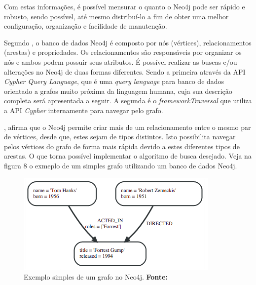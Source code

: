 
\par Com estas informações, é possível mensurar o quanto o Neo4j pode ser rápido e robusto, sendo possível, até mesmo distribuí-lo a fim de obter uma melhor configuração, organização e facilidade de manutenção.

\par Segundo , o banco de dados Neo4j é composto por nós (vértices), relacionamentos (arestas) e propriedades. Os relacionamentos são responsáveis por organizar os nós e ambos podem possuir seus atributos. É possível realizar as buscas e/ou alterações no Neo4j de duas formas diferentes. Sendo a primeira através da API \textit{Cypher Query Language}, que é uma \textit{query language} para banco de dados orientado a grafos muito próxima da linguagem humana, cuja sua descrição completa será apresentada a seguir. A segunda é o \textit{framework\footnotemark[11] Traversal} que utiliza a API \textit{Cypher} internamente para navegar pelo grafo.



, afirma que o Neo4j permite criar mais de um relacionamento entre o mesmo par de vértices, desde que, estes sejam de tipos distintos. Isto possibilita navegar pelos vértices do grafo de forma mais rápida devido a estes diferentes tipos de arestas. O que torna possível implementar o algoritmo de busca desejado. Veja na figura 8 o exmeplo de um simples grafo utilizando um banco de dados Neo4j.


\begin{figure}[h!]
	\centerline{\includegraphics[scale=0.8]{./imagens/simple_graph_neo4j.png}}
	\caption[Exemplo simples de um grafo no Neo4j]
	{Exemplo simples de um grafo no Neo4j. \textbf{Fonte:} }
	\label{fig:exemplo1}
\end{figure}

